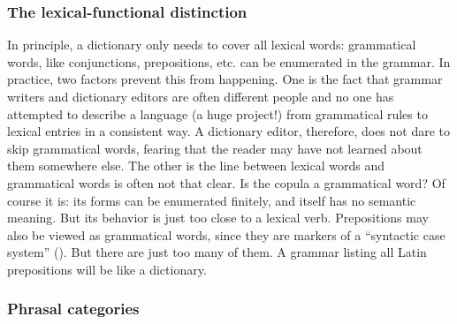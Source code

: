 \documentclass{article}
\begin{document}
\subsubsection{The lexical-functional distinction}\label{sec:lexical-function-distinction}

In principle, a dictionary only needs to cover all lexical words:
grammatical words, like conjunctions, prepositions, etc. can be enumerated in the grammar.
In practice, two factors prevent this from happening.
One is the fact that grammar writers and dictionary editors are often different people 
and no one has attempted to describe a language (a huge project!) 
from grammatical rules to lexical entries in a consistent way.
A dictionary editor, therefore, does not dare to skip grammatical words,
fearing that the reader may have not learned about them somewhere else.
The other is the line between lexical words and grammatical words is often not that clear.
Is the copula a grammatical word?
Of course it is: its forms can be enumerated finitely,
and itself has no semantic meaning.
But its behavior is just too close to a lexical verb.
Prepositions may also be viewed as grammatical words,
since they are markers of a ``syntactic case system'' ().
But there are just too many of them.
A grammar listing all Latin prepositions will be like a dictionary.

\subsubsection{Phrasal categories}
\end{document}
